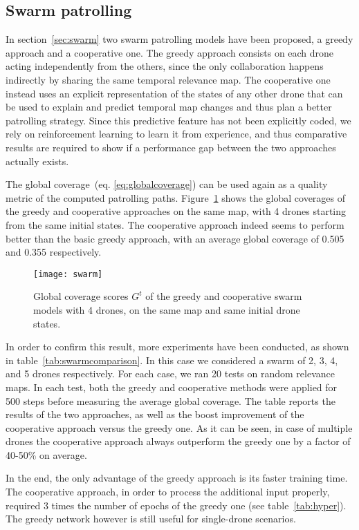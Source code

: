\documentclass{article}
\begin{document}
\subsection{Swarm patrolling}
In section~\ref{sec:swarm} two swarm patrolling models have been proposed, a greedy approach and a cooperative one. The greedy approach consists on each drone acting independently from the others, since the only collaboration happens indirectly by sharing the same temporal relevance map. The cooperative one instead uses an explicit representation of the states of any other drone that can be used to explain and predict temporal map changes and thus plan a better patrolling strategy. Since this predictive feature has not been explicitly coded, we rely on reinforcement learning to learn it from experience, and thus comparative results are required to show if a performance gap between the two approaches actually exists. 

The global coverage~(eq. \ref{eq:globalcoverage}) can be used again as a quality metric of the computed patrolling paths. Figure~\ref{fig:swarm} shows the global coverages of the greedy and cooperative approaches on the same map, with 4 drones starting from the same initial states. The cooperative approach indeed seems to perform better than the basic greedy approach, with an average global coverage of 0.505 and 0.355 respectively.
\begin{figure}
	\centering
	\texttt{[image: swarm]}
	\caption{Global coverage scores $G^t$ of the greedy and cooperative swarm models with 4 drones, on the same map and same initial drone states.}
	\label{fig:swarm}
\end{figure}

In order to confirm this result, more experiments have been conducted, as shown in table~\ref{tab:swarmcomparison}. In this case we considered a swarm of 2, 3, 4, and 5 drones respectively. For each case, we ran 20 tests on random relevance maps. In each test, both the greedy and cooperative methods were applied for 500 steps before measuring the average global coverage. The table reports the results of the two approaches, as well as the boost improvement of the cooperative approach versus the greedy one. As it can be seen, in case of multiple drones the cooperative approach always outperform the greedy one by a factor of 40-50\% on average.

In the end, the only advantage of the greedy approach is its faster training time. The cooperative approach, in order to process the additional input properly, required 3 times the number of epochs of the greedy one (see table~\ref{tab:hyper}). The greedy network however is still useful for single-drone scenarios.
\end{document}

